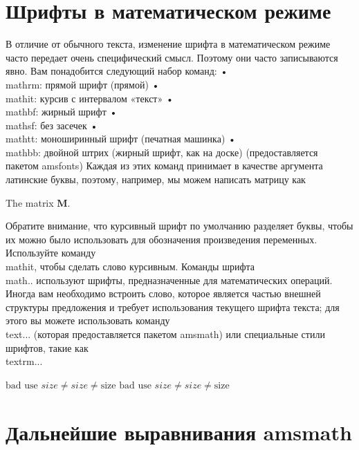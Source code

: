 \documentclass[leqno]{article}
\begin{document}
  \smallskip



  \section{Шрифты в математическом режиме}
  \label{sec:fonts}

  В отличие от обычного текста, изменение шрифта в математическом режиме часто передает очень специфический смысл.
  Поэтому они часто записываются явно. Вам понадобится следующий набор команд:
  • \\mathrm: прямой шрифт (прямой)
  • \\mathit: курсив с интервалом «текст»
  • \\mathbf: жирный шрифт
  • \\mathsf: без засечек
  • \\mathtt: моноширинный шрифт (печатная машинка)
  • \\mathbb: двойной штрих (жирный шрифт, как на доске) (предоставляется пакетом amsfonts)
  Каждая из этих команд принимает в качестве аргумента латинские буквы, поэтому, например, мы можем написать
  матрицу как

  \begin{center}
  The matrix $\mathbf{M}$.
  \end{center}

  Обратите внимание, что курсивный шрифт по умолчанию разделяет буквы, чтобы их можно было использовать для обозначения
  произведения переменных. Используйте команду \\mathit, чтобы сделать слово курсивным.
  Команды шрифта \\math.. используют шрифты, предназначенные для математических операций. Иногда вам
  необходимо встроить слово, которое является частью внешней структуры предложения и требует использования
  текущего шрифта текста; для этого вы можете использовать команду \\text{...} (которая предоставляется пакетом
  amsmath) или специальные стили шрифтов, такие как \\textrm{..}.

  \begin{center}
  $\text{bad use } size \neq \mathit{size} \neq \mathrm{size} $
  \textit{$\text{bad use } size \neq \mathit{size} \neq
  \mathrm{size} $}
  \end{center}

  \section{Дальнейшие выравнивания amsmath}
  \label{sec:alignment}
\end{document}
